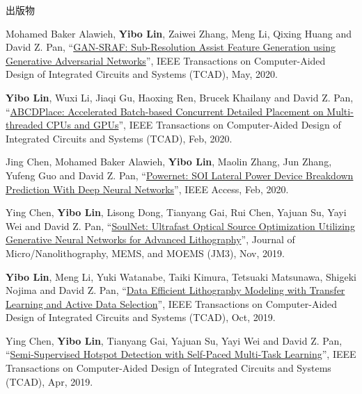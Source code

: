 \begin{rSection}{出版物}
\begin{description}[font=\normalfont, rightmargin=2em]
{}
            

\item[{[J19]}]{
        Mohamed Baker Alawieh, \textbf{Yibo Lin}, Zaiwei Zhang, Meng Li, Qixing Huang and David Z. Pan, 
    ``\href{https://doi.org/10.1109/TCAD.2020.2995338}{GAN-SRAF: Sub-Resolution Assist Feature Generation using Generative Adversarial Networks}'', 
    IEEE Transactions on Computer-Aided Design of Integrated Circuits and Systems (TCAD), May, 2020.
    
}
            

\item[{[J18]}]{
        \textbf{Yibo Lin}, Wuxi Li, Jiaqi Gu, Haoxing Ren, Brucek Khailany and David Z. Pan, 
    ``\href{https://doi.org/10.1109/TCAD.2020.2971531}{ABCDPlace: Accelerated Batch-based Concurrent Detailed Placement on Multi-threaded CPUs and GPUs}'', 
    IEEE Transactions on Computer-Aided Design of Integrated Circuits and Systems (TCAD), Feb, 2020.
    
}
            

\item[{[J17]}]{
        Jing Chen, Mohamed Baker Alawieh, \textbf{Yibo Lin}, Maolin Zhang, Jun Zhang, Yufeng Guo and David Z. Pan, 
    ``\href{https://doi.org/10.1109/ACCESS.2020.2970966}{Powernet: SOI Lateral Power Device Breakdown Prediction With Deep Neural Networks}'', 
    IEEE Access, Feb, 2020.
    
}
            

\item[{[J16]}]{
        Ying Chen, \textbf{Yibo Lin}, Lisong Dong, Tianyang Gai, Rui Chen, Yajuan Su, Yayi Wei and David Z. Pan, 
    ``\href{https://dx.doi.org/10.1117/1.JMM.18.4.043506}{SoulNet: Ultrafast Optical Source Optimization Utilizing Generative Neural Networks for Advanced Lithography}'', 
    Journal of Micro/Nanolithography, MEMS, and MOEMS (JM3), Nov, 2019.
    
}
            

\item[{[J15]}]{
        \textbf{Yibo Lin}, Meng Li, Yuki Watanabe, Taiki Kimura, Tetsuaki Matsunawa, Shigeki Nojima and David Z. Pan, 
    ``\href{https://doi.org/10.1109/TCAD.2018.2864251}{Data Efficient Lithography Modeling with Transfer Learning and Active Data Selection}'', 
    IEEE Transactions on Computer-Aided Design of Integrated Circuits and Systems (TCAD), Oct, 2019.
    
}
            

\item[{[J14]}]{
        Ying Chen, \textbf{Yibo Lin}, Tianyang Gai, Yajuan Su, Yayi Wei and David Z. Pan, 
    ``\href{https://doi.org/10.1109/TCAD.2019.2912948}{Semi-Supervised Hotspot Detection with Self-Paced Multi-Task Learning}'', 
    IEEE Transactions on Computer-Aided Design of Integrated Circuits and Systems (TCAD), Apr, 2019.
    
}
\end{description}
\end{rSection}
